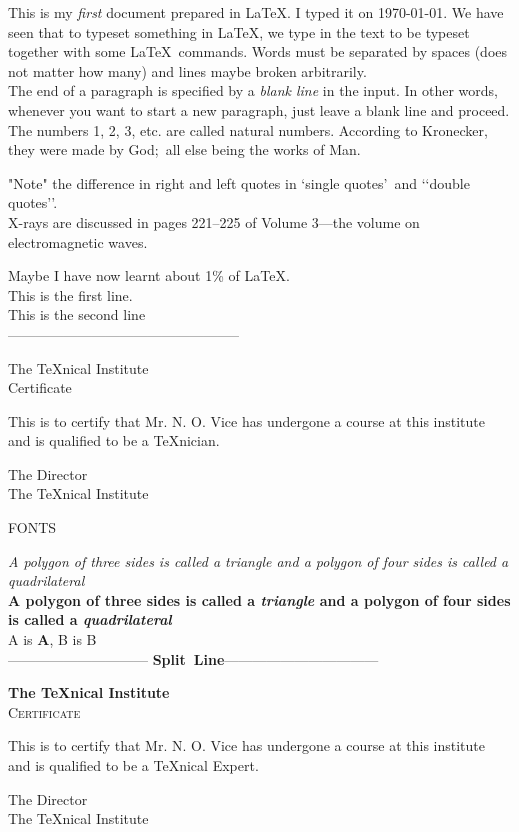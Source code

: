 \documentclass{article}
\theoremstyle{definition}
\theoremstyle{remark}
\theoremstyle{plain}
\numberwithin{equation}{subsection}
\begin{document}
This is my \emph{first} document prepared in \LaTeX. I typed it on \today.
\indent We have seen that to typeset something in \LaTeX, we type in the
text to be typeset together with some \LaTeX\ commands.
Words must be separated by spaces (does not matter how many)
and lines maybe broken arbitrarily.\\
\indent The end of a paragraph is specified by a \emph{blank line}
in the input. In other words, whenever you want to start a new
paragraph, just leave a blank line and proceed.\\
\indent The numbers 1, 2, 3, etc. are called natural numbers. According to
Kronecker, they were made by God;\ all else being the works of Man.

"Note" the difference in right and left quotes in \lq single
quotes\rq\ and \lq\lq double quotes\rq\rq.\\
\indent X-rays are discussed in pages 221--225 of Volume 3---the volume on
electromagnetic waves.

Maybe I have now learnt about 1\% of \LaTeX.\\
This is the first line.\\[10pt] 
This is the second line\\
--------------------------------------------------\\
\begin{center}
	The \TeX nical Institute\\[.75cm]
	Certificate
\end{center}
\noindent This is to certify that Mr. N. O. Vice has undergone a
course at this institute and is qualified to be a \TeX nician.
\begin{flushright}
	The Director\\
	The \TeX nical Institute
\end{flushright} 
\begin{center}
	FONTS
\end{center}
\noindent \textit{A polygon of three sides is called a \emph{triangle} and a
polygon of four sides is called a \emph{quadrilateral}}\\
\textbf{A polygon of three sides is called a
	\emph{triangle} and a polygon of four sides is called a
	\emph{quadrilateral}}\\
    A is \textbf{A}, B is B\\
------------------------------ \textbf{Split\ Line}---------------------------------
\begin{center}
	{\bfseries\huge The \TeX nical Institute}\\[1cm]
	{\scshape\LARGE Certificate}
\end{center}
\noindent This is to certify that Mr. N. O. Vice has undergone a
course at this institute and is qualified to be a \TeX nical Expert.
\begin{flushright}
	{\sffamily The Director\\
		The \TeX nical Institute}
\end{flushright}
\end{document}
